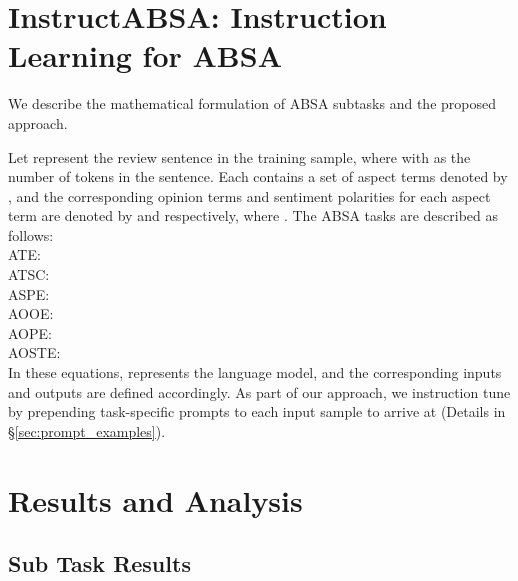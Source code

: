\documentclass[11pt]{article}
\newcommand{\name}{\textsc{I}nstruct\textsc{ABSA}\xspace}
\begin{document}
\section{\name{}: Instruction Learning for ABSA }

We describe the mathematical formulation of ABSA subtasks and the proposed approach.





Let  represent the  review sentence in the training sample, where  with  as the number of tokens in the sentence. 
Each  contains a set of aspect terms denoted by , and the corresponding opinion terms and sentiment polarities for each aspect term are denoted by  and  respectively, where . 
The ABSA tasks are described as follows:\\
ATE: \\
ATSC: \\
ASPE: \\
AOOE: \\
AOPE: \\
AOSTE: \\
In these equations,  represents the language model, and the corresponding inputs and outputs are defined accordingly. As part of our approach, we instruction tune  by prepending task-specific prompts to each input sample to arrive at  (Details in \S \ref{sec:prompt_examples}). 





\section{Results and Analysis}
\label{sec_results}

\subsection{Sub Task Results}
\end{document}
